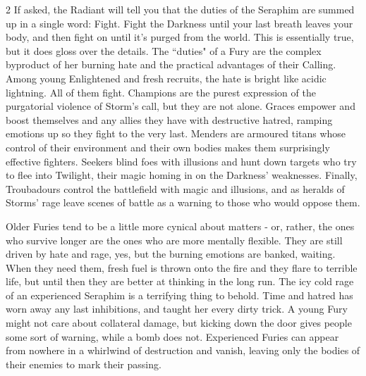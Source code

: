 \begin{multicols}{2}
If asked, the Radiant will tell you that the duties of the Seraphim are summed up in a single word: Fight. Fight the Darkness until your last breath leaves your body, and then fight on until it's purged from the world. This is essentially true, but it does gloss over the details. The \textquotedblleft duties" of a Fury are the complex byproduct of her burning hate and the practical advantages of their Calling. Among young Enlightened and fresh recruits, the hate is bright like acidic lightning. All of them fight. Champions are the purest expression of the purgatorial violence of Storm's call, but they are not alone. Graces empower and boost themselves and any allies they have with destructive hatred, ramping emotions up so they fight to the very last. Menders are armoured titans whose control of their environment and their own bodies makes them surprisingly effective fighters. Seekers blind foes with illusions and hunt down targets who try to flee into Twilight, their magic homing in on the Darkness' 
weaknesses. Finally, 
Troubadours control the battlefield with magic and illusions, and as heralds of Storms' rage leave scenes of battle as a warning to those who would oppose them.

Older Furies tend to be a little more cynical about matters - or, rather, the ones who survive longer are the ones who are more mentally flexible. They are still driven by hate and rage, yes, but the burning emotions are banked, waiting. When they need them, fresh fuel is thrown onto the fire and they flare to terrible life, but until then they are better at thinking in the long run. The icy cold rage of an experienced Seraphim is a terrifying thing to behold. Time and hatred has worn away any last inhibitions, and taught her every dirty trick. A young Fury might not care about collateral damage, but kicking down the door gives people some sort of warning, while a bomb does not. Experienced Furies can appear from nowhere in a whirlwind of destruction and vanish, leaving only the bodies of their enemies to mark their passing.


\end{multicols}
